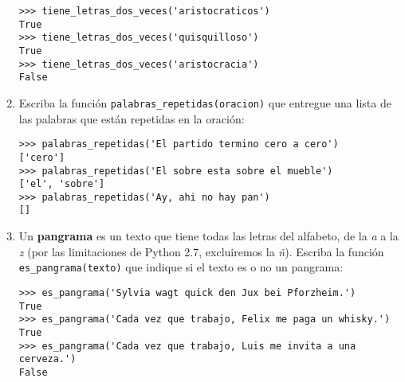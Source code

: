 \begin{enumerate}
\begin{lstlisting}
>>> tiene_letras_dos_veces('aristocraticos')
True
>>> tiene_letras_dos_veces('quisquilloso')
True
>>> tiene_letras_dos_veces('aristocracia')
False
\end{lstlisting}
\item
  Escriba la función \lstinline!palabras_repetidas(oracion)! que
  entregue una lista de las palabras que están repetidas en la oración:

\begin{lstlisting}
>>> palabras_repetidas('El partido termino cero a cero')
['cero']
>>> palabras_repetidas('El sobre esta sobre el mueble')
['el', 'sobre']
>>> palabras_repetidas('Ay, ahi no hay pan')
[]
\end{lstlisting}
\item
  Un \textbf{pangrama} es un texto que tiene todas las letras del
  alfabeto, de la \emph{a} a la \emph{z} (por las limitaciones de Python
  2.7, excluiremos la \emph{ñ}). Escriba la función
  \lstinline!es_pangrama(texto)! que indique si el texto es o no un
  pangrama:

\begin{lstlisting}
>>> es_pangrama('Sylvia wagt quick den Jux bei Pforzheim.')
True
>>> es_pangrama('Cada vez que trabajo, Felix me paga un whisky.')
True
>>> es_pangrama('Cada vez que trabajo, Luis me invita a una cerveza.')
False
\end{lstlisting}
\end{enumerate}
